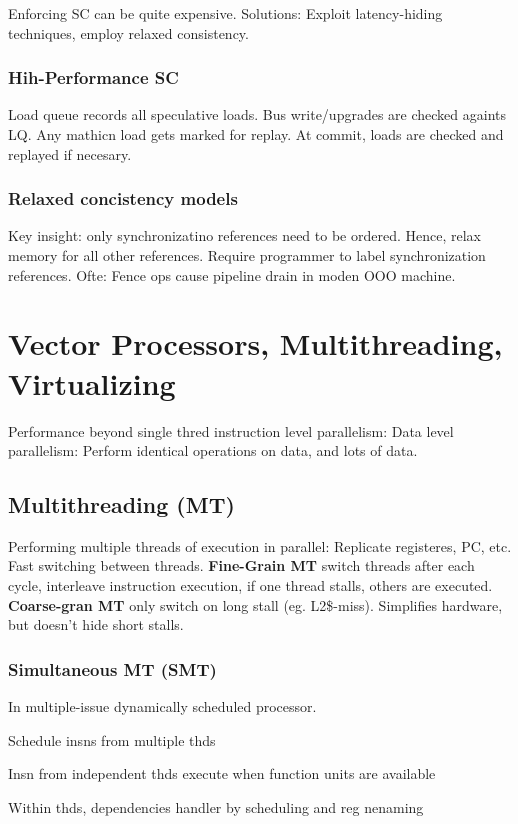 \documentclass[a4paper, fontsize=8pt, landscape, DIV=1]{scrartcl}
\makeatletter
\renewenvironment{outline}[1][]{%
  \ifthenelse{\equal{#1}{}}{}{\renewcommand{\ol@type}{#1}}%
  \ol@z%
  \newcommand{\0}{\ol@toz\ol@z}%
  \newcommand{\1}{\vspace{\dimexpr\outlinespacingscalar\baselineskip-\baselineskip}\ol@toi\ol@i\item}%
  \newcommand{\2}{\vspace{\dimexpr\outlinespacingscalartwo\baselineskip-\baselineskip}\ol@toii\ol@ii\item}%
  \newcommand{\3}{\vspace{\dimexpr\outlinespacingscalar\baselineskip-\baselineskip}\ol@toiii\ol@iii\item}%
  \newcommand{\4}{\vspace{\dimexpr\outlinespacingscalar\baselineskip-\baselineskip}\ol@toiiii\ol@iiii\item}%
}{%
  \ol@toz\ol@exit%
}
\def\outlinespacingscalar{0.5}
\def\outlinespacingscalartwo{0.5}
\makeatother
\begin{document}
\begin{multicols*}{4}
  Enforcing SC can be quite expensive. Solutions: Exploit latency-hiding techniques,
  employ relaxed consistency.

  \subsubsection{Hih-Performance SC}
  Load queue records all speculative loads. Bus write/upgrades are checked againts LQ.
  Any mathicn load gets marked for replay. At commit, loads are checked and replayed if necesary.

  \subsubsection{Relaxed concistency models}
  Key insight: only synchronizatino references need to be ordered. Hence, relax memory
  for all other references. Require programmer to label synchronization references.
  Ofte: Fence ops cause pipeline drain in moden OOO machine.

  \section{Vector Processors, Multithreading, Virtualizing}
  Performance beyond single thred instruction level parallelism: Data level
  parallelism: Perform identical operations on data, and lots of data.

  \subsection{Multithreading (MT)}
  Performing multiple threads of execution in parallel: Replicate registeres, PC, etc.
  Fast switching between threads. \textbf{Fine-Grain MT} switch threads after each cycle, 
  interleave instruction execution, if one thread stalls, others are executed.
  \textbf{Coarse-gran MT} only switch on long stall (eg. L2\$-miss). Simplifies
  hardware, but doesn't hide short stalls.

  \subsubsection{Simultaneous MT (SMT)}
  In multiple-issue dynamically scheduled processor. 
  \begin{outline}
    \1 Schedule insns from multiple thds
    \1 Insn from independent thds execute when function units are available
    \1 Within thds, dependencies handler by scheduling and reg nenaming
  \end{outline}


\end{multicols*}
\end{document}
